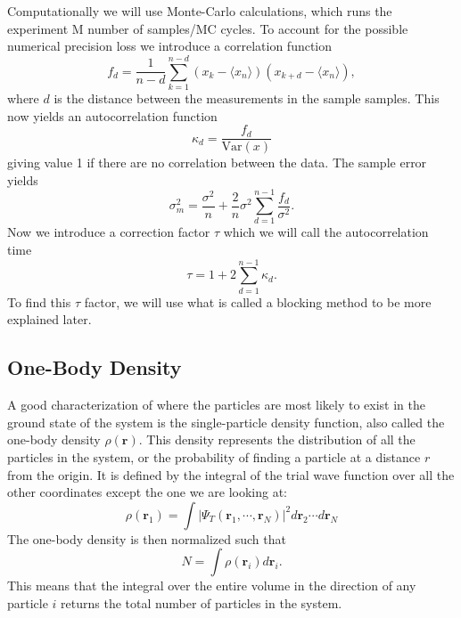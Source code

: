 \documentclass[12pt,a4paper,english]{article}
\begin{document}
Computationally we will use Monte-Carlo calculations, which runs the experiment M number of samples/MC cycles. To account for the possible numerical precision loss we introduce a correlation function 
\begin{equation}
\label{eq:stat_corr_func}
f_d=\frac{1}{n-d}\sum_{k=1}^{n-d}(x_k-\langle x_n\rangle)(x_{k+d}-\langle x_n\rangle),
\end{equation}
where $d$ is the distance between the measurements in the sample samples. This now yields an autocorrelation function
\begin{equation}
\label{eq:stat_autocorr}
\kappa_d=\frac{f_d}{\text{Var}(x)}
\end{equation}
giving value 1 if there are no correlation between the data. The sample error yields
\begin{equation*}
\sigma_m^2=\frac{\sigma^2}{n}+\frac{2}{n}\sigma^2\sum_{d=1}^{n-1}\frac{f_d}{\sigma^2}.
\end{equation*}
Now we introduce a correction factor $\tau$ which we will call the autocorrelation time
\begin{equation}
\label{eq:stat_autocorr_time}
\tau= 1+2\sum_{d=1}^{n-1}\kappa_d.
\end{equation}
To find this $\tau$ factor, we will use what is called a blocking method to be more explained later.

\subsection{One-Body Density}
\label{subsect:One_body_density}
A good characterization of where the particles are most likely to exist in the ground state of the system is the single-particle density function, also called the one-body density $\rho(\textbf{r})$. This density represents the distribution of all the particles in the system, or the probability of finding a particle at a distance $r$ from the origin. It is defined by the integral of the trial wave function over all the other coordinates except the one we are looking at:
\begin{equation}
\label{eq:one-body}
\rho(\textbf{r}_1)=\int |\Psi_T(\textbf{r}_1,\cdots,\textbf{r}_N)|^2d\textbf{r}_2 \cdots d\textbf{r}_N
\end{equation}
The one-body density is then normalized such that 
\[N=\int\rho(\textbf{r}_i)d\textbf{r}_i.\]
This means that the integral over the entire volume in the direction of any particle $i$ returns the total number of particles in the system.
\end{document}
